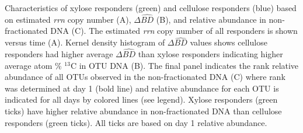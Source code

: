 Characteristics of xylose responders (green) and cellulose responders (blue)
based on estimated \textit{rrn} copy number (A), $\Delta\hat{BD}$ (B), and
relative abundance in non-fractionated DNA (C). The estimated \textit{rrn} copy
number of all responders is shown versus time (A). Kernel density histogram of
$\Delta\hat{BD}$ values shows cellulose responders had higher average
$\Delta\hat{BD}$ than xylose responders indicating higher average atom \%
$^{13}$C in OTU DNA (B). The final panel indicates the rank relative abundance
of all OTUs observed in the non-fractionated DNA (C) where rank was determined
at day 1 (bold line) and relative abundance for each OTU is indicated for all
days by colored lines (see legend). Xylose responders (green ticks) have higher
relative abundance in non-fractionated DNA than cellulose responders (green ticks). 
All ticks are based on day 1 relative abundance.
